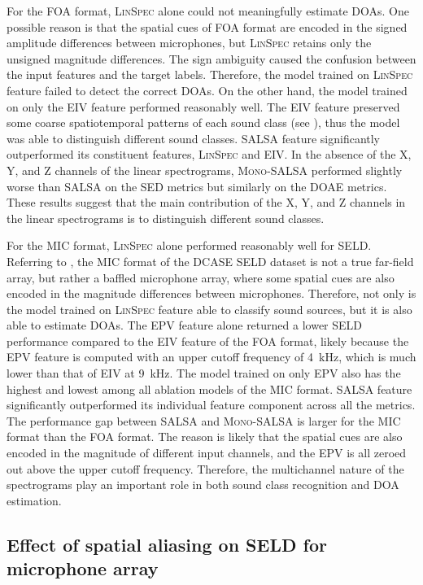 \documentclass[journal]{IEEEtran}
\newcommand{\ER}{\xspace}
\newcommand{\Fone}{\xspace}
\begin{document}
For the FOA format, \textsc{LinSpec} alone could not meaningfully estimate DOAs. One possible reason is that the spatial cues of FOA format are encoded in the signed amplitude differences between microphones, but \textsc{LinSpec} retains only the unsigned magnitude differences. 
The sign ambiguity caused the confusion between the input features and the target labels. Therefore, the model trained on \textsc{LinSpec} feature failed to detect the correct DOAs. On the other hand, the model trained on only the EIV feature performed reasonably well. The EIV feature preserved some coarse spatiotemporal patterns of each sound class (see ), thus the model was able to distinguish different sound classes. 
SALSA feature significantly outperformed its constituent features, \textsc{LinSpec} and EIV. In the absence of the X, Y, and Z channels of the linear spectrograms, \textsc{Mono-SALSA} performed slightly worse than SALSA on the SED metrics but similarly on the DOAE metrics. These results suggest that the main contribution of the X, Y, and Z channels in the linear spectrograms is to distinguish different sound classes. 

For the MIC format, \textsc{LinSpec} alone performed reasonably well for SELD. Referring to , the MIC format of the DCASE SELD dataset is not a true far-field array, but rather a baffled microphone array, where some spatial cues are also encoded in the magnitude differences between microphones. Therefore, not only is the model trained on \textsc{LinSpec} feature able to classify sound sources, but it is also able to estimate DOAs. The EPV feature alone returned a lower SELD performance compared to the EIV feature of the FOA format, likely because the EPV feature is computed with an upper cutoff frequency of \SI{4}{\kilo\hertz}, which is much lower than that of EIV at \SI{9}{\kilo\hertz}. 
The model trained on only EPV also has the highest \ER and lowest \Fone among all ablation models of the MIC format. SALSA feature significantly outperformed its individual feature component across all the metrics. The performance gap between SALSA and \textsc{Mono-SALSA} is larger for the MIC format than the FOA format. The reason is likely that the spatial cues are also encoded in the magnitude of different input channels, and the EPV is all zeroed out above the upper cutoff frequency. Therefore, the multichannel nature of the spectrograms play an important role in both sound class recognition and DOA estimation. 

\subsection{Effect of spatial aliasing on SELD for microphone array}
\end{document}
